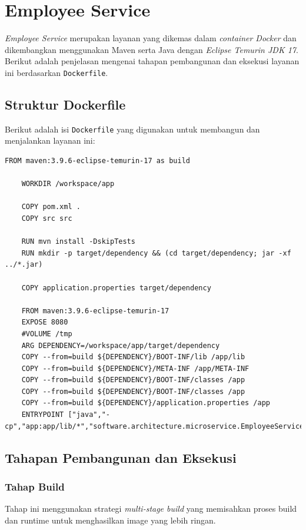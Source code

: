 \section{Employee Service}

\textit{Employee Service} merupakan layanan yang dikemas dalam \textit{container Docker} dan dikembangkan menggunakan Maven serta Java dengan \textit{Eclipse Temurin JDK 17}. Berikut adalah penjelasan mengenai tahapan pembangunan dan eksekusi layanan ini berdasarkan \texttt{Dockerfile}.

\subsection{Struktur Dockerfile}

Berikut adalah isi \texttt{Dockerfile} yang digunakan untuk membangun dan menjalankan layanan ini:

\begin{lstlisting}[language=docker]
	FROM maven:3.9.6-eclipse-temurin-17 as build
	
	WORKDIR /workspace/app
	
	COPY pom.xml .
	COPY src src
	
	RUN mvn install -DskipTests
	RUN mkdir -p target/dependency && (cd target/dependency; jar -xf ../*.jar)
	
	COPY application.properties target/dependency
	
	FROM maven:3.9.6-eclipse-temurin-17
	EXPOSE 8080
	#VOLUME /tmp
	ARG DEPENDENCY=/workspace/app/target/dependency
	COPY --from=build ${DEPENDENCY}/BOOT-INF/lib /app/lib
	COPY --from=build ${DEPENDENCY}/META-INF /app/META-INF
	COPY --from=build ${DEPENDENCY}/BOOT-INF/classes /app
	COPY --from=build ${DEPENDENCY}/BOOT-INF/classes /app
	COPY --from=build ${DEPENDENCY}/application.properties /app
	ENTRYPOINT ["java","-cp","app:app/lib/*","software.architecture.microservice.EmployeeServiceApplication"]
\end{lstlisting}

\subsection{Tahapan Pembangunan dan Eksekusi}

\subsubsection{Tahap Build}
Tahap ini menggunakan strategi \textit{multi-stage build} yang memisahkan proses build dan runtime untuk menghasilkan image yang lebih ringan.

